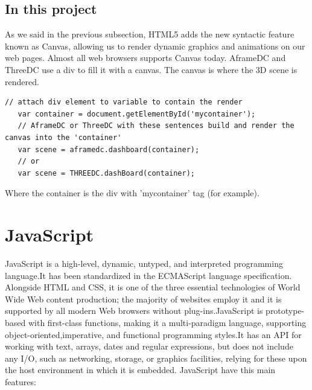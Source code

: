 \documentclass[a4paper, 12pt]{book}
\begin{document}
\subsection{In this project}
\label{sec:html5itp}
As we said in the previous subsection, HTML5 adds the new syntactic feature known as Canvas, allowing us to render dynamic graphics and animations on our web pages. Almost all web browsers supports Canvas today.
AframeDC and ThreeDC use a div to fill it with a canvas. The canvas is where the 3D scene is rendered.
\lstset{language=Java, breaklines=true, basicstyle=\footnotesize}
\begin{lstlisting}[frame=single]
   // attach div element to variable to contain the render
   var container = document.getElementById('mycontainer');
   // AframeDC or ThreeDC with these sentences build and render the canvas into the 'container'
   var scene = aframedc.dashboard(container);
   // or
   var scene = THREEDC.dashBoard(container);
\end{lstlisting}
Where the container is the div with 'mycontainer' tag (for example).

\section{JavaScript}
\label{sec:js}
JavaScript is a high-level, dynamic, untyped, and interpreted programming language.It has been standardized in the ECMAScript language specification. Alongside HTML and CSS, it is one of the three essential technologies of World Wide Web content production; the majority of websites employ it and it is supported by all modern Web browsers without plug-ins.JavaScript is prototype-based with first-class functions, making it a multi-paradigm language, supporting object-oriented,imperative, and functional programming styles.It has an API for working with text, arrays, dates and regular expressions, but does not include any I/O, such as networking, storage, or graphics facilities, relying for these upon the host environment in which it is embedded. JavaScript have this main features:
\end{document}
